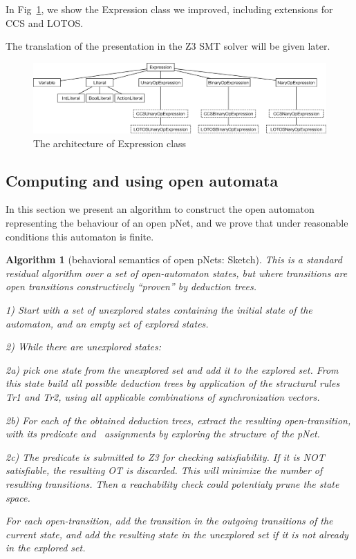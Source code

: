 \documentclass{lncs/llncs}
\newcommand{\TODO}[1]{\textcolor{red}{\textbf{[TODO:#1]}}}
\newcommand{\QIN}[1]{\textcolor{airforceblue}{#1}}
\newcommand{\Post}{\symb{Post}}
\newtheorem{alg}[theorem]{Algorithm}
\begin{document}
In Fig~\ref{schema:expression-pnets}, we show the Expression class we
improved, including extensions for CCS and LOTOS.

\QIN{The translation of the presentation in the Z3 SMT solver will be given later.
}

\begin{figure}[t]
  \includegraphics[width=\linewidth]{XFIG/Expression}
  \caption{The architecture of Expression class}  \label{schema:expression-pnets}
\end{figure}


\subsection{Computing and using open automata}
In this section we present an algorithm to construct the open
automaton representing the behaviour of an open pNet, and we prove that
under reasonable conditions this automaton is finite.

\begin{alg}[behavioral semantics of open pNets: Sketch]
This is a standard residual algorithm over a set of open-automaton
states, but where transitions are open transitions
constructively ``proven'' by deduction trees.

1) Start with a set of unexplored states containing the initial state
of the automaton, and an empty set of explored states.

2) While there are unexplored states:

2a) pick one state from the unexplored set and add it to the explored
set. From this state
build all possible deduction trees by application of the structural
rules Tr1 and Tr2, using all applicable combinations
of synchronization vectors.

2b) For each of the obtained deduction trees, extract the resulting
open-transition, with its predicate and \Post\ assignments by exploring the structure of 
the pNet.

2c)
The predicate is submitted to Z3 for checking satisfiability. If it is
NOT satisfiable, the resulting OT is discarded. This will minimize the
number of 
resulting transitions. Then a reachability check could potentialy
prune the state space.

For each open-transition,  add the transition in the outgoing transitions of
the current state, and add the
resulting state in the unexplored set if it is not already in the
explored set.

\end{alg}
\end{document}
